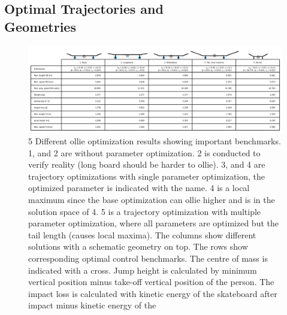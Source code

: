 \documentclass[default,iicol]{sn-jnl}
\begin{document}
\subsection{Optimal Trajectories and \\Geometries}
\begin{figure}
    \centering
    \includegraphics[width=\textwidth]{paper/figure/Results/ResultsTable.png}
    \caption[Results benchmarks]{5 Different ollie optimization results showing important benchmarks. 1, and 2 are without parameter optimization. 2 is conducted to verify reality (long board should be harder to ollie). 3, and 4 are trajectory optimizations with single parameter optimization, the optimized parameter is indicated with the name. 4 is a local maximum since the base optimization can ollie higher and is in the solution space of 4. 5 is a trajectory optimization with multiple parameter optimization, where all parameters are optimized but the tail length (causes local maxima). The columns show different solutions with a schematic geometry on top. The rows show corresponding optimal control benchmarks. The centre of mass is indicated with a cross. Jump height is calculated by minimum vertical position minus take-off vertical position of the person. The impact loss is calculated with kinetic energy of the skateboard after impact minus kinetic energy of the }
    \label{fig:resultstable}
\end{figure}

\end{document}
